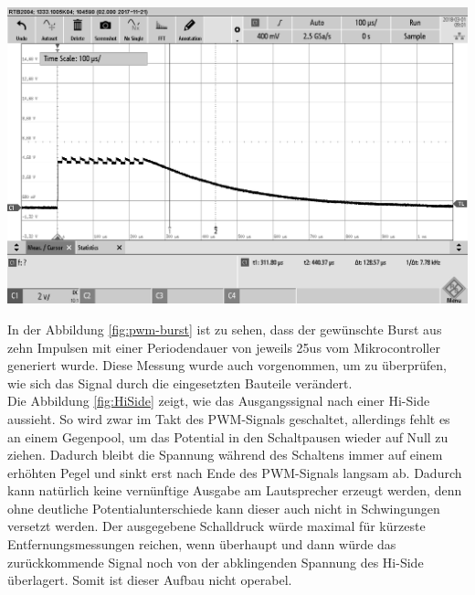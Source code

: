 \begin{minipage}{0.5\textwidth}
\includegraphics[width=1\textwidth%
]{Abbildungen/MessungenP1/PWM-ausgabe-mit-Hi-Side.png}
\label{fig:HiSide}
\end{minipage}
In der Abbildung \ref{fig:pwm-burst} ist zu sehen, dass der gewünschte Burst aus zehn Impulsen mit einer Periodendauer von jeweils 25us vom Mikrocontroller generiert wurde. Diese Messung wurde auch vorgenommen, um zu überprüfen, wie sich das Signal durch die eingesetzten Bauteile verändert.\\
Die Abbildung \ref{fig:HiSide} zeigt, wie das Ausgangssignal nach einer Hi-Side aussieht. So wird zwar im Takt des PWM-Signals geschaltet, allerdings fehlt es an einem Gegenpool, um das Potential in den Schaltpausen wieder auf Null zu ziehen. Dadurch bleibt die Spannung während des Schaltens immer auf einem erhöhten Pegel und sinkt erst nach Ende des PWM-Signals langsam ab. Dadurch kann natürlich keine vernünftige Ausgabe am Lautsprecher erzeugt werden, denn ohne deutliche Potentialunterschiede kann dieser auch nicht in Schwingungen versetzt werden. Der ausgegebene Schalldruck würde maximal für kürzeste Entfernungsmessungen reichen, wenn überhaupt und dann würde das zurückkommende Signal noch von der abklingenden Spannung des Hi-Side überlagert. Somit ist dieser Aufbau nicht operabel.\\
